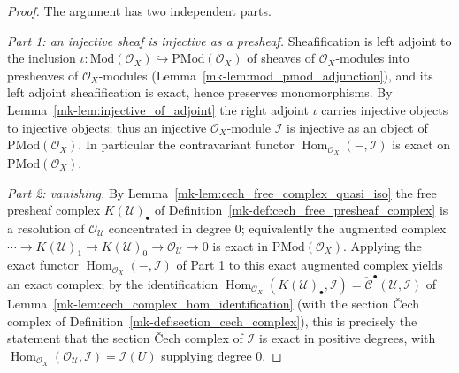 \begin{proof}
  The argument has two independent parts.

  \emph{Part 1: an injective sheaf is injective as a presheaf.} Sheafification is
  left adjoint to the inclusion
  \(\iota : \mathrm{Mod}(\mathcal{O}_X) \hookrightarrow \mathrm{PMod}(\mathcal{O}_X)\)
  of sheaves of \(\mathcal{O}_X\)-modules into presheaves of
  \(\mathcal{O}_X\)-modules (Lemma~\ref{mk-lem:mod_pmod_adjunction}), and its left
  adjoint sheafification is exact, hence preserves monomorphisms. By
  Lemma~\ref{mk-lem:injective_of_adjoint} the right adjoint \(\iota\) carries injective
  objects to injective objects; thus an injective \(\mathcal{O}_X\)-module
  \(\mathcal{I}\) is injective as an object of \(\mathrm{PMod}(\mathcal{O}_X)\). In
  particular the contravariant functor \(\operatorname{Hom}_{\mathcal{O}_X}(-,
  \mathcal{I})\) is exact on \(\mathrm{PMod}(\mathcal{O}_X)\).

  \emph{Part 2: vanishing.} By Lemma~\ref{mk-lem:cech_free_complex_quasi_iso} the free
  presheaf complex \(K(\mathcal{U})_\bullet\) of
  Definition~\ref{mk-def:cech_free_presheaf_complex} is a resolution of
  \(\mathcal{O}_{\mathcal{U}}\) concentrated in degree \(0\); equivalently the
  augmented complex \(\cdots \to K(\mathcal{U})_1 \to K(\mathcal{U})_0 \to
  \mathcal{O}_{\mathcal{U}} \to 0\) is exact in \(\mathrm{PMod}(\mathcal{O}_X)\).
  Applying the exact functor \(\operatorname{Hom}_{\mathcal{O}_X}(-, \mathcal{I})\)
  of Part 1 to this exact augmented complex yields an exact complex; by the
  identification \(\operatorname{Hom}_{\mathcal{O}_X}(K(\mathcal{U})_\bullet,
  \mathcal{I}) = \check{\mathcal{C}}^\bullet(\mathcal{U}, \mathcal{I})\) of
  Lemma~\ref{mk-lem:cech_complex_hom_identification} (with the section {\v C}ech complex
  of Definition~\ref{mk-def:section_cech_complex}), this is precisely the statement that
  the section {\v C}ech complex of \(\mathcal{I}\) is exact in positive degrees, with
  \(\operatorname{Hom}_{\mathcal{O}_X}(\mathcal{O}_{\mathcal{U}}, \mathcal{I}) =
  \mathcal{I}(U)\) supplying degree \(0\).


\end{proof}
